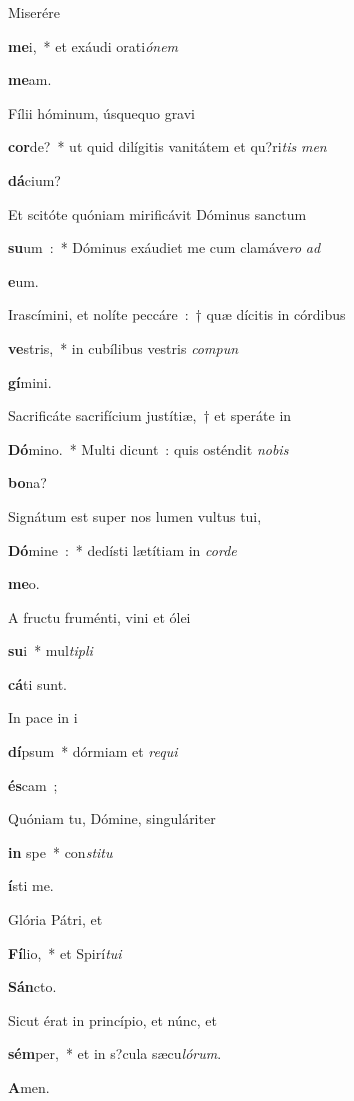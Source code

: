 ﻿\item Miserére {\textbf{me}i,~* et exáudi orati{\it ó}{\it nem} {\textbf{me}am.
\item Fílii hóminum, úsquequo gravi {\textbf{cor}de?~* ut quid dilígitis vanitátem et qu?ri{\it tis} {\it men}{\textbf{dá}cium?
\item Et scitóte quóniam mirificávit Dóminus sanctum {\textbf{su}um~:~* Dóminus exáudiet me cum clamáve{\it ro} {\it ad} {\textbf{e}um.
\item Irascímini, et nolíte peccáre~:~† quæ dícitis in córdibus {\textbf{ve}stris,~* in cubílibus vestris {\it com}{\it pun}{\textbf{gí}mini.
\item Sacrificáte sacrifícium justítiæ,~† et speráte in {\textbf{Dó}mino.~* Multi dicunt~: quis osténdit {\it no}{\it bis} {\textbf{bo}na?
\item Signátum est super nos lumen vultus tui, {\textbf{Dó}mine~:~* dedísti lætítiam in {\it cor}{\it de} {\textbf{me}o.
\item A fructu fruménti, vini et ólei {\textbf{su}i~* mul{\it ti}{\it pli}{\textbf{cá}ti sunt.
\item In pace in i{\textbf{dí}psum~* dórmiam et {\it re}{\it qui}{\textbf{és}cam~;
\item Quóniam tu, Dómine, singuláriter {\textbf{in} spe~* con{\it sti}{\it tu}{\textbf{í}sti me.
\item Glória Pátri, et {\textbf{Fí}lio,~* et Spirí{\it tu}{\it i} {\textbf{Sán}cto.
\item Sicut érat in princípio, et núnc, et {\textbf{sém}per,~* et in s?cula sæcu{\it ló}{\it rum}. {\textbf{A}men.


}}}}}}}}}}}}}}}}}}}}}}
